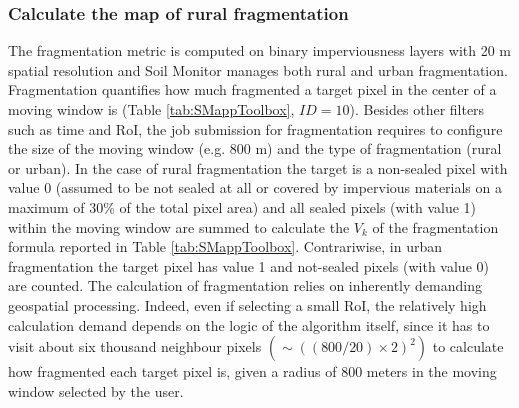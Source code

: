 \documentclass[APA,LATO1COL,doublespace]{WileyNJD-v2}
\newcommand{\toberevised}[1]{\emph{\textcolor{red}{#1}}} %
\begin{document}
\subsubsection{Calculate the map of rural fragmentation}
\label{sec:mmFragmentation}
The fragmentation metric is computed on binary imperviousness layers with 20 m spatial resolution and Soil Monitor manages both rural and urban fragmentation.
Fragmentation quantifies how much fragmented a target pixel in the center of a moving window is (Table \ref{tab:SMappToolbox}, $ID = 10$).
Besides other filters such as time and RoI, the job submission for fragmentation requires to configure the size of the moving window (e.g. 800 m) and the type of fragmentation (rural or urban).
In the case of rural fragmentation the target is a non-sealed pixel with value 0 (assumed to be not sealed at all or covered by impervious materials on a maximum of 30\% of the total pixel area) and all sealed pixels (with value 1) within the moving window are summed to calculate the $V_k$ of the fragmentation formula reported in Table \ref{tab:SMappToolbox}.
Contrariwise, in urban fragmentation the target pixel has value 1 and not-sealed pixels (with value 0) are counted.
The calculation of fragmentation relies on inherently demanding geospatial processing.
Indeed, even if selecting a small RoI, the relatively high calculation demand depends on the logic of the algorithm itself, since it has to visit about six thousand neighbour pixels $\left( \sim \left( \left(800/20\right)\times2 \right)^2 \right)$ to calculate how fragmented each target pixel is, given a radius of 800 meters in the moving window selected by the user.
\end{document}
